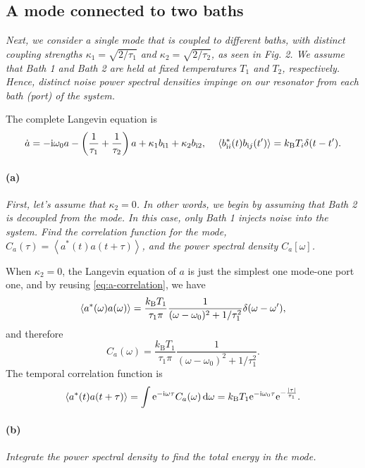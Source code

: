 \documentclass[hyperref, a4paper]{article}
\newcommand*{\ii}{\mathrm{i}}
\newcommand*{\ee}{\mathrm{e}}
\newcommand*{\kB}{k_{\text{B}}}
\newcommand*{\bii}[1]{b_{\text{i#1}}}
\begin{document}
\subsection{A mode connected to two baths}

\textit{Next, we consider a single mode that is coupled to different baths, with distinct coupling strengths $\kappa_1=\sqrt{2 / \tau_1}$ and $\kappa_2=\sqrt{2 / \tau_2}$, as seen in Fig. 2. We assume that Bath 1 and Bath 2 are held at fixed temperatures $T_1$ and $T_2$, respectively. Hence, distinct noise power spectral densities impinge on our resonator from each bath (port) of the system.}

The complete Langevin equation is  
\begin{equation}
    \dot{a} = - \ii \omega_0 a - \left( \frac{1}{\tau_1} + \frac{1}{\tau_2} \right) a + \kappa_1 \bii{1} + \kappa_2 \bii{2}, \quad  
    \expval*{\bii{$i$}^*(t) \bii{$j$}(t')} = \kB T_i \delta(t - t').
\end{equation}

\paragraph*{(a)} \textit{First, let's assume that $\kappa_2=0$. In other words, we begin by assuming that Bath 2 is decoupled from the mode. In this case, only Bath 1 injects noise into the system. Find the correlation function for the mode, $C_a(\tau)=\left\langle a^*(t) a(t+\tau)\right\rangle$, and the power spectral density $C_a[\omega]$.} 

When $\kappa_2 = 0$, the Langevin equation of $a$ is just the simplest one mode-one port one,
and by reusing \eqref{eq:a-correlation}, we have 
\begin{equation}
    \expval{a^*(\omega) a(\omega)} = \frac{\kB T_1}{\tau_1 \pi} \frac{1}{(\omega - \omega_0)^2 + 1 / \tau_1^2} \delta(\omega - \omega'),
\end{equation}
and therefore
\begin{equation}
    C_a(\omega) = \frac{\kB T_1}{\tau_1 \pi} \frac{1}{(\omega - \omega_0)^2 + 1 / \tau_1^2}.
\end{equation}
The temporal correlation function is 
\begin{equation}
    \expval{a^*(t) a(t + \tau)} = \int \ee^{- \ii \omega \tau} C_a(\omega) \dd{\omega} = 
    \kB T_1 \ee^{- \ii \omega_0 \tau} \ee^{- \frac{\abs*{\tau}}{\tau_1}}.
\end{equation}

\paragraph*{(b)} \textit{Integrate the power spectral density to find the total energy in the mode.} 
\end{document}
